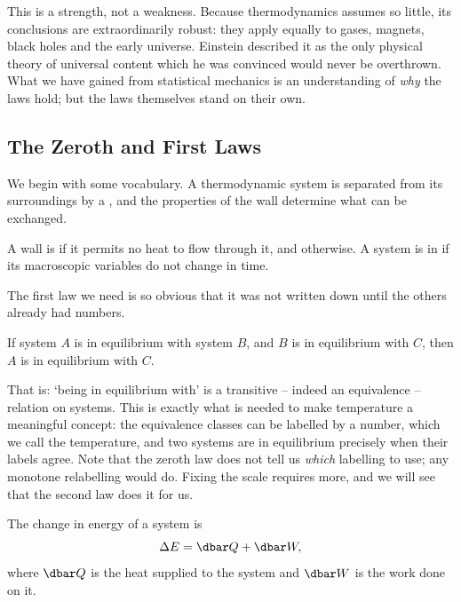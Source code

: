 This is a strength, not a weakness. Because thermodynamics assumes so little, its conclusions are extraordinarily robust: they apply equally to gases, magnets, black holes and the early universe. Einstein described it as the only physical theory of universal content which he was convinced would never be overthrown. What we have gained from statistical mechanics is an understanding of \emph{why} the laws hold; but the laws themselves stand on their own.

\subsection{The Zeroth and First Laws}

We begin with some vocabulary. A thermodynamic system is separated from its surroundings by a , and the properties of the wall determine what can be exchanged.

\begin{definition}
	A wall is  if it permits no heat to flow through it, and  otherwise. A system is in  if its macroscopic variables do not change in time.
\end{definition}

The first law we need is so obvious that it was not written down until the others already had numbers.

\begin{law}
	If system $A$ is in equilibrium with system $B$, and $B$ is in equilibrium with $C$, then $A$ is in equilibrium with $C$.
\end{law}

That is: `being in equilibrium with' is a transitive -- indeed an equivalence -- relation on systems. This is exactly what is needed to make temperature a meaningful concept: the equivalence classes can be labelled by a number, which we call the temperature, and two systems are in equilibrium precisely when their labels agree. Note that the zeroth law does not tell us \emph{which} labelling to use; any monotone relabelling would do. Fixing the scale requires more, and we will see that the second law does it for us.

\begin{law}
	The change in energy of a system is
	$$
	\Delta E = \dbar Q + \dbar W,
	$$
	where $\dbar Q$ is the heat supplied to the system and $\dbar W$ is the work done on it.
\end{law}

